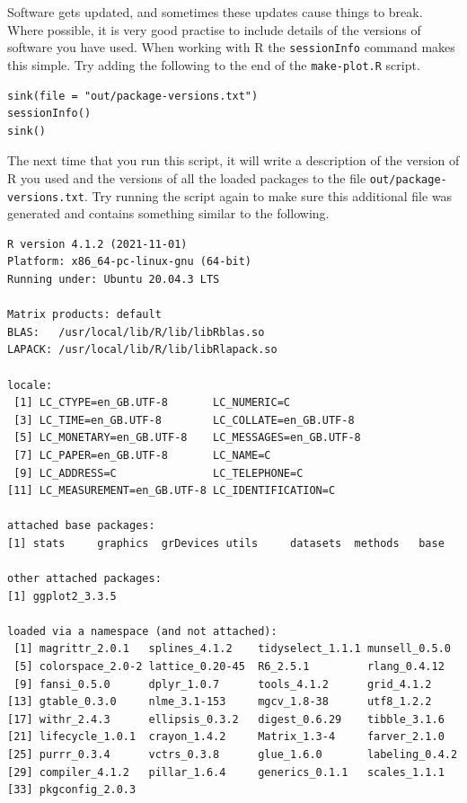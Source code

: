 \documentclass[11pt,onecolumn]{scrartcl}
\begin{document}
Software gets updated, and sometimes these updates cause things to break. Where
possible, it is very good practise to include details of the versions of
software you have used. When working with R the \texttt{sessionInfo} command makes this
simple. Try adding the following to the end of the \texttt{make-plot.R} script.

\lstset{language=r,label= ,caption= ,captionpos=b,numbers=none}
\begin{lstlisting}
sink(file = "out/package-versions.txt")
sessionInfo()
sink()
\end{lstlisting}

The next time that you run this script, it will write a description of the
version of R you used and the versions of all the loaded packages to the file
\texttt{out/package-versions.txt}. Try running the script again to make sure this
additional file was generated and contains something similar to the following.

\begin{Verbatim}[frame=single,framerule=0.5mm,framesep=2mm,label=Session information,xleftmargin=5mm,xrightmargin=5mm,fontsize=\small]
R version 4.1.2 (2021-11-01)
Platform: x86_64-pc-linux-gnu (64-bit)
Running under: Ubuntu 20.04.3 LTS

Matrix products: default
BLAS:   /usr/local/lib/R/lib/libRblas.so
LAPACK: /usr/local/lib/R/lib/libRlapack.so

locale:
 [1] LC_CTYPE=en_GB.UTF-8       LC_NUMERIC=C
 [3] LC_TIME=en_GB.UTF-8        LC_COLLATE=en_GB.UTF-8
 [5] LC_MONETARY=en_GB.UTF-8    LC_MESSAGES=en_GB.UTF-8
 [7] LC_PAPER=en_GB.UTF-8       LC_NAME=C
 [9] LC_ADDRESS=C               LC_TELEPHONE=C
[11] LC_MEASUREMENT=en_GB.UTF-8 LC_IDENTIFICATION=C

attached base packages:
[1] stats     graphics  grDevices utils     datasets  methods   base

other attached packages:
[1] ggplot2_3.3.5

loaded via a namespace (and not attached):
 [1] magrittr_2.0.1   splines_4.1.2    tidyselect_1.1.1 munsell_0.5.0
 [5] colorspace_2.0-2 lattice_0.20-45  R6_2.5.1         rlang_0.4.12
 [9] fansi_0.5.0      dplyr_1.0.7      tools_4.1.2      grid_4.1.2
[13] gtable_0.3.0     nlme_3.1-153     mgcv_1.8-38      utf8_1.2.2
[17] withr_2.4.3      ellipsis_0.3.2   digest_0.6.29    tibble_3.1.6
[21] lifecycle_1.0.1  crayon_1.4.2     Matrix_1.3-4     farver_2.1.0
[25] purrr_0.3.4      vctrs_0.3.8      glue_1.6.0       labeling_0.4.2
[29] compiler_4.1.2   pillar_1.6.4     generics_0.1.1   scales_1.1.1
[33] pkgconfig_2.0.3
\end{Verbatim}
\end{document}
